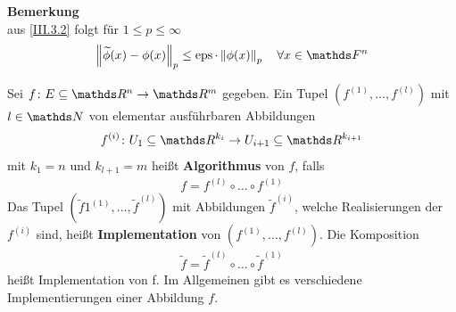 \textbf{Bemerkung}\\
aus \eqref{III.3.2} folgt für $1\leq p\leq \infty$
\begin{gather}
  \nn[\widetilde{\phi}(x)-\phi(x)]_p \leq \Eps\cdot\nn[\phi(x)]_p
  \quad \forall x\in\F^n \label{III.3.3}
\end{gather}

\begin{Defe}\label{3.3.4}
  Sei $f\colon E\subseteq \Ren \to \R^m$ gegeben.
  Ein Tupel $\left(f^{(1)},\dotsc ,f^{(l)}\right)$ 
  mit $l\in \N$ von elementar ausführbaren Abbildungen
  \begin{gather*}
    f^{(i)}\colon U_1\subseteq \R^{k_i} \to U_{i+1}\subseteq \R^{k_{i+1}}
  \end{gather*}
  mit $k_1=n$ und $k_{l+1}=m$ heißt 
  \textbf{Algorithmus} von $f$, falls
  \begin{gather*}
    f=f	^{(l)}\circ \dotsc \circ f^{(1)}
  \end{gather*}
  Das Tupel $(\widetilde{f}1^{(1)},\dotsc ,\widetilde{f}^{(l)})$ 
  mit Abbildungen $\widetilde{f}^{(i)}$, 
  welche Realisierungen der $f^{(i)}$ sind,
  heißt \textbf{Implementation} von 
  $\left(f^{(1)},\dotsc ,f^{(l)}\right)$.
  Die Komposition 
  \begin{gather*}
    \widetilde{f}=\widetilde{f}	^{(l)}\circ \dotsc \circ \widetilde{f}^{(1)}
  \end{gather*}
  heißt Implementation von f.
  Im Allgemeinen gibt es verschiedene Implementierungen einer Abbildung $f$.
\end{Defe}


